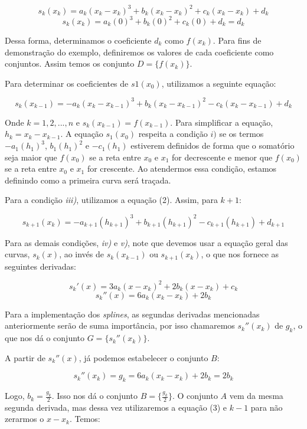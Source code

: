 \documentclass[11pt]{article}
\begin{document}
$$s_k(x_k) = a_k(x_k - x_k)^3 + b_k(x_k - x_k)^2 + c_k(x_k - x_k) + d_k$$
$$s_k(x_k) = a_k(0)^3 + b_k(0)^2 + c_k(0) + d_k = d_k$$

Dessa forma, determinamos o coeficiente $d_k$ como $f(x_k)$. Para fins de
demonstração do exemplo, definiremos os valores de cada coeficiente como
conjuntos. Assim temos os conjunto $D = \{f(x_k)\}$.

Para determinar os coeficientes de $s1(x_0)$, utilizamos a seguinte equação:

\begin{equation}
s_k(x_{k-1}) = -a_k(x_k - x_{k-1})^3 + b_k(x_k - x_{k-1})^2 - c_k(x_k - x_{k-1}) + d_k
\end{equation}

Onde $k = 1, 2, ..., n$ e $s_k(x_{k-1}) = f(x_{k-1})$.
Para simplificar a equação, $h_k = x_k - x_{k-1}$.
A equação $s_1(x_0)$ respeita a condição $i)$ se os termos $-a_1(h_1)^3$,
$b_1(h_1)^2$ e $-c_1(h_1)$ estiverem definidos de forma que o somatório seja
maior que $f(x_0)$ se a reta entre $x_0$ e $x_1$ for decrescente e menor que $f(x_0)$
se a reta entre $x_0$ e $x_1$ for crescente. Ao atendermos essa
condição, estamos definindo como a primeira curva será traçada.

Para a condição \textit{iii)}, utilizamos a equação (2). Assim, para $k+1$:

\begin{equation}
s_{k+1}(x_k) = -a_{k+1}(h_{k+1})^3 + b_{k+1}(h_{k+1})^2 - c_{k+1}(h_{k+1}) + d_{k+1}
\end{equation}

Para as demais condições, \textit{iv)} e \textit{v)}, note que devemos
usar a equação geral das curvas, $s_k(x)$, ao invés de $s_k(x_{k-1})$ ou
$s_{k+1}(x_{k})$, o que nos fornece as seguintes derivadas:

$$s_k'(x) = 3a_k(x - x_k)^2 + 2b_k(x - x_k) + c_k$$
$$s_k''(x) = 6a_k(x_k - x_k) + 2b_k$$

Para a implementação dos \textit{splines}, as segundas derivadas
mencionadas anteriormente serão de suma importância, por isso
chamaremos $s_k''(x_k)$ de $g_k$, o que nos dá o conjunto $G = \{s_k''(x_k)\}$.

A partir de $s_k''(x)$, já podemos estabelecer o conjunto $B$:

$$s_k''(x_k) = g_k = 6a_k(x_k - x_k) + 2b_k = 2b_k$$

Logo, $b_k = \frac{g_k}{2}$. Isso nos dá o conjunto $B = \{\frac{g_k}{2}\}$.
O conjunto $A$ vem da mesma segunda derivada, mas dessa vez utilizaremos a
equação (3) e $k-1$ para não zerarmos o $x - x_k$. Temos:
\end{document}
